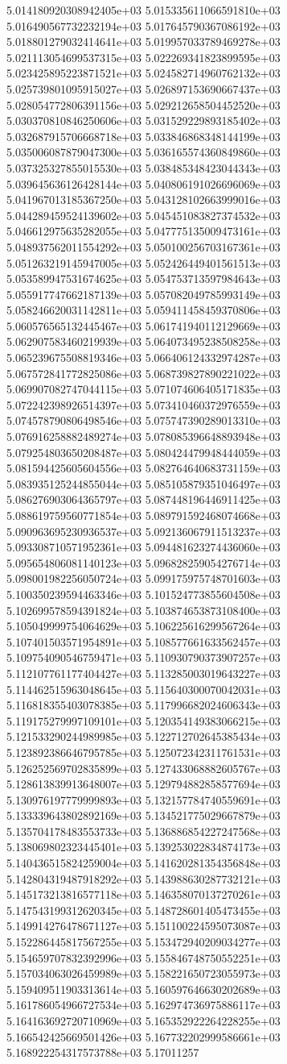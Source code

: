 	5.014180920308942405e+03	5.015335611066591810e+03	5.016490567732232194e+03	5.017645790367086192e+03	5.018801279032414641e+03	5.019957033789469278e+03	5.021113054699537315e+03	5.022269341823899595e+03	5.023425895223871521e+03	5.024582714960762132e+03	5.025739801095915027e+03	5.026897153690667437e+03	5.028054772806391156e+03	5.029212658504452520e+03	5.030370810846250606e+03	5.031529229893185402e+03	5.032687915706668718e+03	5.033846868348144199e+03	5.035006087879047300e+03	5.036165574360849860e+03	5.037325327855015530e+03	5.038485348423044343e+03	5.039645636126428144e+03	5.040806191026696069e+03	5.041967013185367250e+03	5.043128102663999016e+03	5.044289459524139602e+03	5.045451083827374532e+03	5.046612975635282055e+03	5.047775135009473161e+03	5.048937562011554292e+03	5.050100256703167361e+03	5.051263219145947005e+03	5.052426449401561513e+03	5.053589947531674625e+03	5.054753713597984643e+03	5.055917747662187139e+03	5.057082049785993149e+03	5.058246620031142811e+03	5.059411458459370806e+03	5.060576565132445467e+03	5.061741940112129669e+03	5.062907583460219939e+03	5.064073495238508258e+03	5.065239675508819346e+03	5.066406124332974287e+03	5.067572841772825086e+03	5.068739827890221022e+03	5.069907082747044115e+03	5.071074606405171835e+03	5.072242398926514397e+03	5.073410460372976559e+03	5.074578790806498546e+03	5.075747390289013310e+03	5.076916258882489274e+03	5.078085396648893948e+03	5.079254803650208487e+03	5.080424479948444059e+03	5.081594425605604556e+03	5.082764640683731159e+03	5.083935125244855044e+03	5.085105879351046497e+03	5.086276903064365797e+03	5.087448196446911425e+03	5.088619759560771854e+03	5.089791592468074668e+03	5.090963695230936537e+03	5.092136067911513237e+03	5.093308710571952361e+03	5.094481623274436060e+03	5.095654806081140123e+03	5.096828259054276714e+03	5.098001982256050724e+03	5.099175975748701603e+03	5.100350239594463346e+03	5.101524773855604508e+03	5.102699578594391824e+03	5.103874653873108400e+03	5.105049999754064629e+03	5.106225616299567264e+03	5.107401503571954891e+03	5.108577661633562457e+03	5.109754090546759471e+03	5.110930790373907257e+03	5.112107761177404427e+03	5.113285003019643227e+03	5.114462515963048645e+03	5.115640300070042031e+03	5.116818355403078385e+03	5.117996682024606343e+03	5.119175279997109101e+03	5.120354149383066215e+03	5.121533290244989985e+03	5.122712702645385434e+03	5.123892386646795785e+03	5.125072342311761531e+03	5.126252569702835899e+03	5.127433068882605767e+03	5.128613839913648007e+03	5.129794882858577694e+03	5.130976197779999893e+03	5.132157784740559691e+03	5.133339643802892169e+03	5.134521775029667879e+03	5.135704178483553733e+03	5.136886854227247568e+03	5.138069802323445401e+03	5.139253022834874173e+03	5.140436515824259004e+03	5.141620281354356848e+03	5.142804319487918292e+03	5.143988630287732121e+03	5.145173213816577118e+03	5.146358070137270261e+03	5.147543199312620345e+03	5.148728601405473455e+03	5.149914276478671127e+03	5.151100224595073087e+03	5.152286445817567255e+03	5.153472940209034277e+03	5.154659707832392996e+03	5.155846748750552251e+03	5.157034063026459989e+03	5.158221650723055973e+03	5.159409511903313614e+03	5.160597646630202689e+03	5.161786054966727534e+03	5.162974736975886117e+03	5.164163692720710969e+03	5.165352922264228255e+03	5.166542425669501426e+03	5.167732202999586661e+03	5.168922254317573788e+03	5.17011257